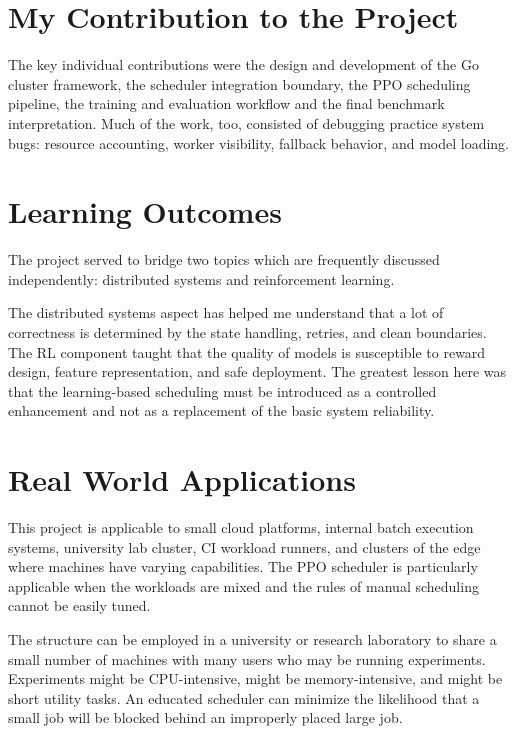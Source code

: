 \section{My Contribution to the Project}
\label{section:my_contribution}

The key individual contributions were the design and development of the Go cluster framework, the scheduler integration boundary, the PPO scheduling pipeline, the training and evaluation workflow and the final benchmark interpretation. Much of the work, too, consisted of debugging practice system bugs: resource accounting, worker visibility, fallback behavior, and model loading.

\section{Learning Outcomes}
\label{section:learnings}

The project served to bridge two topics which are frequently discussed independently: distributed systems and reinforcement learning.

 The distributed systems aspect has helped me understand that a lot of correctness is determined by the state handling, retries, and clean boundaries. The RL component taught that the quality of models is susceptible to reward design, feature representation, and safe deployment. The greatest lesson here was that the learning-based scheduling must be introduced as a controlled enhancement and not as a replacement of the basic system reliability.

\section{Real World Applications}
\label{section:real_world_app}

This project is applicable to small cloud platforms, internal batch execution systems, university lab cluster, CI workload runners, and clusters of the edge where machines have varying capabilities. The PPO scheduler is particularly applicable when the workloads are mixed and the rules of manual scheduling cannot be easily tuned.

The structure can be employed in a university or research laboratory to share a small number of machines with many users who may be running experiments. Experiments might be CPU-intensive, might be memory-intensive, and might be short utility tasks. An educated scheduler can minimize the likelihood that a small job will be blocked behind an improperly placed large job.


